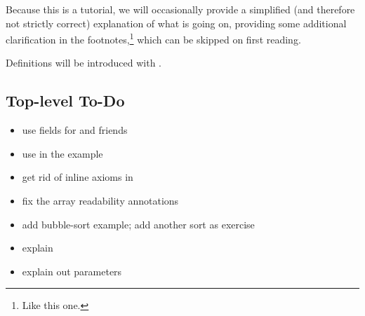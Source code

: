   Because this is a tutorial, we will occasionally provide a simplified (and
  therefore not strictly correct) explanation of what is going on, providing
  some additional clarification in the footnotes,\footnote{Like this one.}
  which can be skipped on first reading.

  Definitions will be introduced with .

\subsection{Top-level To-Do}

\begin{itemize}
\item use fields for \vcc{\consistent} and friends
\item use \vcc{\old} in the  example
\item get rid of inline axioms in 
\item fix the  array readability annotations
\item add bubble-sort example; add another sort as exercise
\item explain \vcc{\at()}
\item explain out parameters
\end{itemize}

